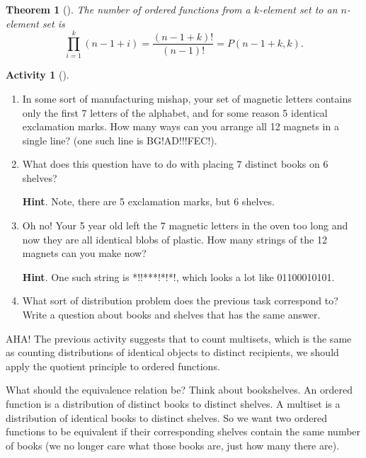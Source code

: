 \documentclass[10pt,]{book}
\theoremstyle{plain}
\newtheorem{theorem}{Theorem}[section]
\theoremstyle{definition}
\theoremstyle{definition}
\theoremstyle{definition}
\newtheorem{activity}[project]{Activity}
\theoremstyle{definition}
\numberwithin{equation}{chapter}
\begin{document}
\begin{theorem}[{}]\label{theorem-13}
\hypertarget{p-748}{}%
The number of ordered functions from a \(k\)-element set to an \(n\)-element set is%
\begin{equation*}
\prod_{i=1}^k (n-1+i) = \frac{(n-1+k)!}{(n-1)!} = P(n-1+k, k).
\end{equation*}
%
\end{theorem}
\begin{activity}[]\label{activity-68}
\leavevmode%
\begin{enumerate}[font=\bfseries,label=(\alph*),ref=\alph*]
\item\label{task-98} \hypertarget{p-749}{}%
In some sort of manufacturing mishap, your set of magnetic letters contains only the first 7 letters of the alphabet, and for some reason 5 identical exclamation marks.  How many ways can you arrange all 12 magnets in a single line?  (one such line is BG!AD!!!FEC!).%
\item\label{task-99} \hypertarget{p-750}{}%
What does this question have to do with placing \(7\) distinct books on \(6\) shelves?%
\par\smallskip%
\noindent\textbf{Hint}.\hypertarget{hint-59}{}\quad%
\hypertarget{p-751}{}%
Note, there are 5 exclamation marks, but 6 shelves.%
\item\label{task-100} \hypertarget{p-752}{}%
Oh no! Your 5 year old left the 7 magnetic letters in the oven too long and now they are all identical blobs of plastic.  How many strings of the 12 magnets can you make now?%
\par\smallskip%
\noindent\textbf{Hint}.\hypertarget{hint-60}{}\quad%
\hypertarget{p-753}{}%
One such string is *!!***!*!*!, which looks a lot like 01100010101.%
\item\label{task-101} \hypertarget{p-754}{}%
What sort of distribution problem does the previous task correspond to?  Write a question about books and shelves that has the same answer.%
\end{enumerate}
\end{activity}
\hypertarget{p-755}{}%
AHA!  The previous activity suggests that to count multisets, which is the same as counting distributions of identical objects to distinct recipients, we should apply the quotient principle to ordered functions.%
\par
\hypertarget{p-756}{}%
What should the equivalence relation be?  Think about bookshelves.  An ordered function is a distribution of distinct books to distinct shelves.  A multiset is a distribution of identical books to distinct shelves.  So we want two ordered functions to be equivalent if their corresponding shelves contain the same number of books (we no longer care what those books are, just how many there are).%
\end{document}
